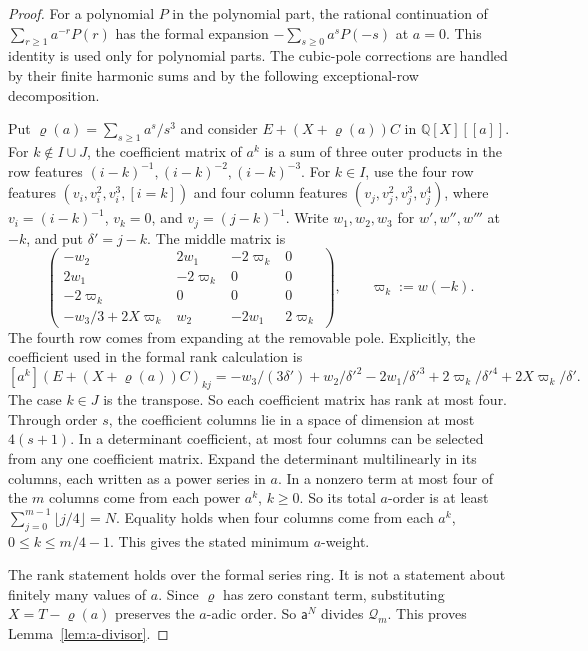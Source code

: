 \begin{proof}
For a polynomial \(P\) in the polynomial part, the rational continuation of \(\sum_{r\ge1} a^{-r} P(r)\) has the formal expansion \(-\sum_{s\ge0} a^s P(-s)\) at \(a=0\). This identity is used only for polynomial parts. The cubic-pole corrections are handled by their finite harmonic sums and by the following exceptional-row decomposition.

Put \(\varrho(a)=\sum_{s\ge1}a^s/s^3\) and consider \(E+(X+\varrho(a))C\) in \({\mathbb Q}[X][[a]]\). For \(k\notin I\cup J\), the coefficient matrix of \(a^k\) is a sum of three outer products in the row features \((i-k)^{-1},(i-k)^{-2},(i-k)^{-3}\). For \(k\in I\), use the four row features \((v_i,v_i^2,v_i^3,[i=k])\) and four column features \((v_j,v_j^2,v_j^3,v_j^4)\), where \(v_i=(i-k)^{-1}\), \(v_k=0\), and \(v_j=(j-k)^{-1}\). Write \(w_1,w_2,w_3\) for \(w',w'',w'''\) at \(-k\), and put \(\delta'=j-k\). The middle matrix is
\[
\begin{pmatrix}
-w_2&2w_1&-2\varpi_k&0\\
2w_1&-2\varpi_k&0&0\\
-2\varpi_k&0&0&0\\
-w_3/3+2X\varpi_k&w_2&-2w_1&2\varpi_k
\end{pmatrix},
\qquad \varpi_k:=w(-k).
\]
The fourth row comes from expanding at the removable pole. Explicitly, the coefficient used in the formal rank calculation is
\[
 [a^k](E+(X+\varrho(a))C)_{kj}
=-w_3/(3\delta')+w_2/\delta'^2-2w_1/\delta'^3
  +2\varpi_k/\delta'^4+2X\varpi_k/\delta' .
\]
The case \(k\in J\) is the transpose. So each coefficient matrix has rank at most four. Through order \(s\), the coefficient columns lie in a space of dimension at most \(4(s+1)\). In a determinant coefficient, at most four columns can be selected from any one coefficient matrix. Expand the determinant multilinearly in its columns, each written as a power series in \(a\). In a nonzero term at most four of the \(m\) columns come from each power \(a^k\), \(k\ge0\). So its total \(a\)-order is at least \(\sum_{j=0}^{m-1}\lfloor j/4\rfloor=N\). Equality holds when four columns come from each \(a^k\), \(0\le k\le m/4-1\). This gives the stated minimum \(a\)-weight.

The rank statement holds over the formal series ring. It is not a statement about finitely many values of \(a\). Since \(\varrho\) has zero constant term, substituting \(X=T-\varrho(a)\) preserves the \(a\)-adic order. So \(\mathsf a^N\) divides \(\mathcal Q_m\). This proves Lemma~\ref{lem:a-divisor}.
\end{proof}

